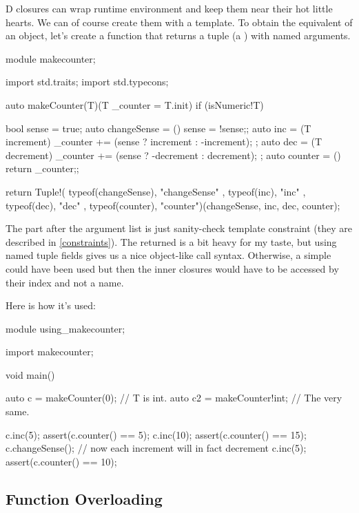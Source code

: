 D closures can wrap runtime environment and keep them near their hot little hearts. We can of course create them with a template. To obtain the equivalent of an object, let's create a function that returns a tuple (a ) with named arguments.

\begin{dcode}
module makecounter;

import std.traits;
import std.typecons;

auto makeCounter(T)(T _counter = T.init) if (isNumeric!T)
{
    bool sense = true;
    auto changeSense = () { sense = !sense;};
    auto inc = (T increment) { _counter += (sense ? increment : -increment); };
    auto dec = (T decrement) { _counter += (sense ? -decrement : decrement); };
    auto counter = () { return _counter;};
    
    return Tuple!( typeof(changeSense), "changeSense"
                 , typeof(inc), "inc"
                 , typeof(dec), "dec"
                 , typeof(counter), "counter")(changeSense, inc, dec, counter);
}
\end{dcode}

The  part after the argument list is just sanity-check template constraint (they are described in \autoref{constraints}). The returned  is a bit heavy for my taste, but using named tuple fields gives us a nice object-like call syntax. Otherwise, a simple  could have been used but then the inner closures would have to be accessed by their index and not a name.

Here is how it's used:

\begin{dcode}
module using_makecounter;

import makecounter;

void main()
{
    auto c = makeCounter(0); // T is int.
    auto c2 = makeCounter!int; // The very same.

    c.inc(5);
    assert(c.counter() == 5);
    c.inc(10);
    assert(c.counter() == 15);
    c.changeSense(); // now each increment will in fact decrement
    c.inc(5);
    assert(c.counter() == 10);
}
\end{dcode}

\subsection{Function Overloading}\label{functionsoverloading}

